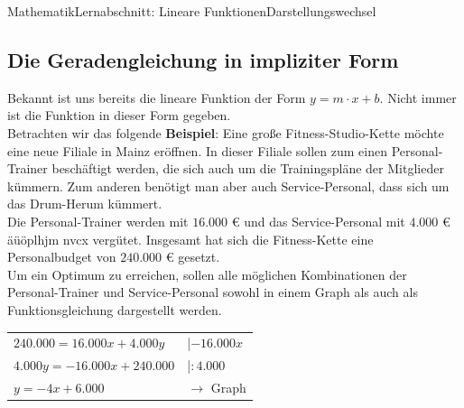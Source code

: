 \documentclass[11pt,twocolumn,oneside,openany,headings=optiontotoc,11pt,numbers=noenddot]{article}
\begin{document}
\begin{worksheet}{Mathematik}{Lernabschnitt: Lineare Funktionen}{Darstellungswechsel}
		\subsection{Die Geradengleichung in impliziter Form}
		Bekannt ist uns bereits die lineare Funktion der Form \(y=m\cdot{}x +b\). Nicht immer ist die Funktion in dieser Form gegeben.\\
		Betrachten wir das folgende \textbf{Beispiel}: Eine große Fitness-Studio-Kette möchte eine neue Filiale in Mainz eröffnen. In dieser Filiale sollen zum einen Personal-Trainer beschäftigt werden, die sich auch um die Trainingspläne der Mitglieder kümmern. Zum anderen benötigt man aber auch Service-Personal, dass sich um das Drum-Herum kümmert.\\
		Die Personal-Trainer werden mit \(16.000\) \euro{} und das Service-Personal mit \(4.000\) \euro{}
		äüöplhjm nvcx vergütet. Insgesamt hat sich die Fitness-Kette eine Personalbudget von \(240.000\) \euro{} gesetzt.\\
		Um ein Optimum zu erreichen, sollen alle möglichen Kombinationen der Personal-Trainer und Service-Personal sowohl in einem Graph als auch als Funktionsgleichung dargestellt werden.\\
		\par\noindent
		\begin{tabularx}{0.48\textwidth}{ll}
			\(240.000 = 16.000x + 4.000y\) & |\(-16.000x\)\\
			\(4.000y = -16.000x + 240.000\) & |\(:4.000\)\\
			\(y = -4x + 6.000\) & \(\rightarrow\) Graph
		\end{tabularx}
		\newpage

\end{worksheet}
\end{document}
